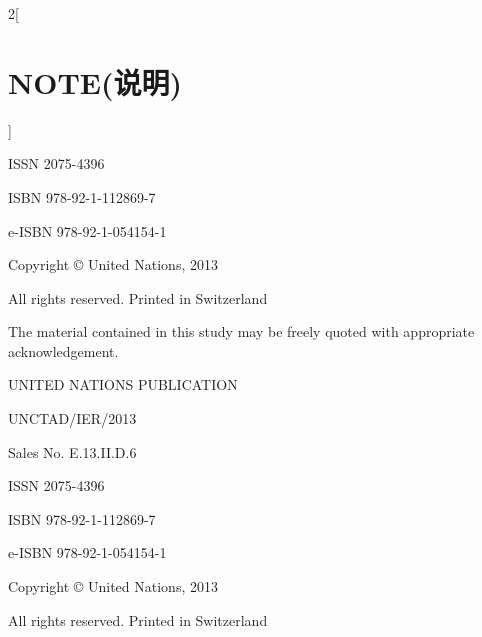 \documentclass[a4paper, UTF8, 12pt]{article}
\begin{document}
\begin{paracol}{2}[\section{NOTE(说明)}]
\begin{center}
        ISSN 2075-4396 

        ISBN 978-92-1-112869-7 

        e-ISBN 978-92-1-054154-1 

        Copyright © United Nations, 2013

        All rights reserved. Printed in Switzerland
    \end{center}

    \switchcolumn
    The material contained in this study may be freely quoted with appropriate acknowledgement.

    \begin{center}
        UNITED NATIONS PUBLICATION 

        UNCTAD/IER/2013 

        Sales No. E.13.II.D.6

        ISSN 2075-4396 

        ISBN 978-92-1-112869-7 

        e-ISBN 978-92-1-054154-1 

        Copyright © United Nations, 2013

        All rights reserved. Printed in Switzerland
    \end{center}

\end{paracol}
\end{document}
